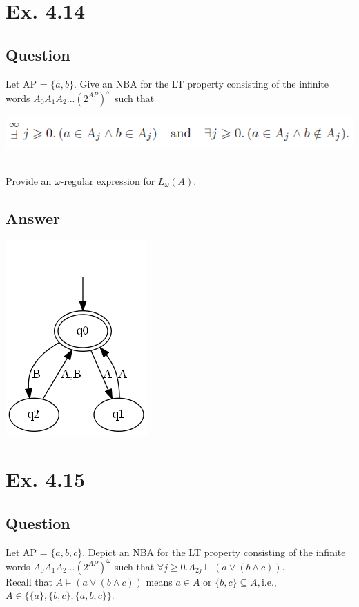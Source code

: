\documentclass[12pt]{article}
\begin{document}
\newpage
\section*{Ex. 4.14}
\subsection*{Question}
Let AP = $\{ a, b \}$. Give an NBA for the LT property consisting of the infinite words $A_0A_1A_2...(2^{AP})^\omega$ such that\\
\begin{centering}
	\includegraphics*[scale=0.7]{ex414Q.png}
\end{centering}\\
Provide an $\omega$-regular expression for $L_\omega(A)$.

\subsection*{Answer}
\begin{centering}
	\includegraphics*[scale=0.5]{ex414.png}
\end{centering}

\section*{Ex. 4.15}
\subsection*{Question}
Let AP = $\{a, b, c\}$. Depict an NBA for the LT property consisting of the infinite
words $A_0A_1A_2...(2^{AP})^\omega$ such that $\forall j \geq 0.A_{2j}\models (a\vee (b\wedge c))$.\\
Recall that $A \models (a\vee (b\wedge c))$ means $a \in A$ or $\{b, c\} \subseteq A, $i.e., $A \in \{\{a\}, \{b, c\}, \{a, b, c\}\}$.
\end{document}
